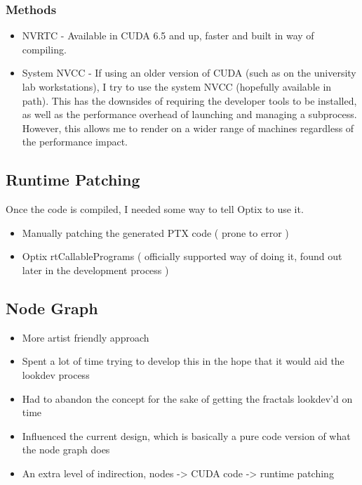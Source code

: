 \documentclass[11pt,a4paper,final,notitlepage]{report}
\begin{document}
\subsubsection{Methods}

\begin{itemize}
	\item NVRTC - Available in CUDA 6.5 and up, faster and built in way of compiling.
	\item System NVCC - If using an older version of CUDA (such as on the university lab workstations), I try to use the system NVCC (hopefully available in path). This has the downsides of requiring the developer tools to be installed, as well as the performance overhead of launching and managing a subprocess. However, this allows me to render on a wider range of machines regardless of the performance impact.
\end{itemize}

\subsection{Runtime Patching}
Once the code is compiled, I needed some way to tell Optix to use it.

\begin{itemize}
	\item Manually patching the generated PTX code ( prone to error )
	\item Optix rtCallablePrograms ( officially supported way of doing it, found out later in the development process )
\end{itemize}

\subsection{Node Graph}

\begin{itemize}
	\item More artist friendly approach
	\item Spent a lot of time trying to develop this in the hope that it would aid the lookdev process
	\item Had to abandon the concept for the sake of getting the fractals lookdev'd on time
	\item Influenced the current design, which is basically a pure code version of what the node graph does
	\item An extra level of indirection, nodes -> CUDA code -> runtime patching
\end{itemize}
\end{document}
